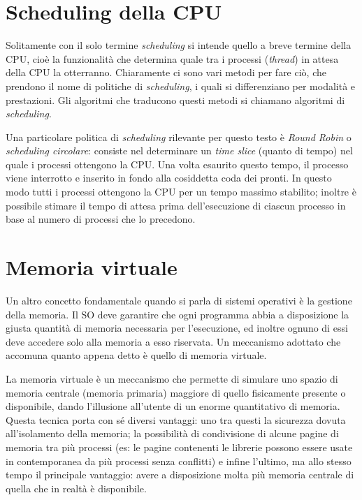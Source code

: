 \section{Scheduling della CPU}
Solitamente con il solo termine \textit{scheduling} si intende quello a breve termine della CPU, cioè la funzionalità che determina quale tra i processi (\textit{thread}) in attesa della CPU la otterranno. Chiaramente ci sono vari metodi per fare ciò, che prendono il nome di politiche di \textit{scheduling}, i quali si differenziano per modalità e prestazioni. Gli algoritmi che traducono questi metodi si chiamano algoritmi di \textit{scheduling}.

Una particolare politica di \textit{scheduling} rilevante per questo testo è \textit{Round Robin} o \textit{scheduling circolare}: consiste nel determinare un \textit{time slice} (quanto di tempo) nel quale i processi ottengono la CPU. Una volta esaurito questo tempo, il processo viene interrotto e inserito in fondo alla cosiddetta coda dei pronti. In questo modo tutti i processi ottengono la CPU per un tempo massimo stabilito; inoltre è possibile stimare il tempo di attesa prima dell'esecuzione di ciascun processo in base al numero di processi che lo precedono.

\section{Memoria virtuale}
Un altro concetto fondamentale quando si parla di sistemi operativi è la gestione della memoria. Il SO deve garantire che ogni programma abbia a disposizione la giusta quantità di memoria necessaria per l'esecuzione, ed inoltre ognuno di essi deve accedere solo alla memoria a esso riservata. Un meccanismo adottato che accomuna quanto appena detto è quello di memoria virtuale.

La memoria virtuale è un meccanismo che permette di simulare uno spazio di memoria centrale (memoria primaria) maggiore di quello fisicamente presente o disponibile, dando l'illusione all'utente di un enorme quantitativo di memoria. Questa tecnica porta con sé diversi vantaggi: uno tra questi la sicurezza dovuta all'isolamento della memoria; la possibilità di condivisione di alcune pagine di memoria tra più processi (es: le pagine contenenti le librerie possono essere usate in contemporanea da più processi senza conflitti) e infine l'ultimo, ma allo stesso tempo il principale vantaggio: avere a disposizione molta più memoria centrale di quella che in realtà è disponibile. 

